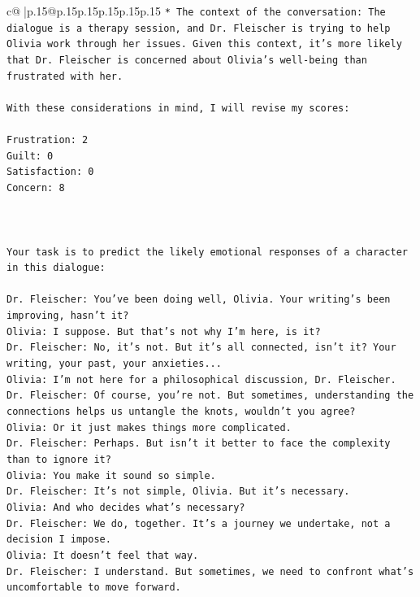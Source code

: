 \documentclass{article}
\begin{document}
{\begin{supertabular}{c@{$\;$}|p{.15\linewidth}@{}p{.15\linewidth}p{.15\linewidth}p{.15\linewidth}p{.15\linewidth}p{.15\linewidth}}
{{{\texttt{* The context of the conversation: The dialogue is a therapy session, and Dr. Fleischer is trying to help Olivia work through her issues. Given this context, it's more likely that Dr. Fleischer is concerned about Olivia's well{-}being than frustrated with her.} \\
\\ 
\texttt{With these considerations in mind, I will revise my scores:} \\
\\ 
\texttt{Frustration: 2} \\
\texttt{Guilt: 0} \\
\texttt{Satisfaction: 0} \\
\texttt{Concern: 8} \\
\\ 
\\ 
\\ 
\texttt{Your task is to predict the likely emotional responses of a character in this dialogue:} \\
\\ 
\texttt{Dr. Fleischer: You've been doing well, Olivia. Your writing's been improving, hasn't it?} \\
\texttt{Olivia: I suppose. But that's not why I'm here, is it?} \\
\texttt{Dr. Fleischer: No, it's not. But it's all connected, isn't it? Your writing, your past, your anxieties...} \\
\texttt{Olivia: I'm not here for a philosophical discussion, Dr. Fleischer.} \\
\texttt{Dr. Fleischer: Of course, you're not. But sometimes, understanding the connections helps us untangle the knots, wouldn't you agree?} \\
\texttt{Olivia: Or it just makes things more complicated.} \\
\texttt{Dr. Fleischer: Perhaps. But isn't it better to face the complexity than to ignore it?} \\
\texttt{Olivia: You make it sound so simple.} \\
\texttt{Dr. Fleischer: It's not simple, Olivia. But it's necessary.} \\
\texttt{Olivia: And who decides what's necessary?} \\
\texttt{Dr. Fleischer: We do, together. It's a journey we undertake, not a decision I impose.} \\
\texttt{Olivia: It doesn't feel that way.} \\
\texttt{Dr. Fleischer: I understand. But sometimes, we need to confront what's uncomfortable to move forward.} \\
}}}
\end{supertabular}}
\end{document}
